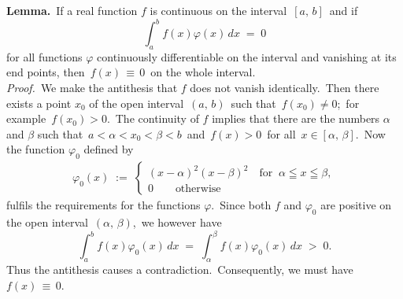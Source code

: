 \documentclass[12pt]{article}
\theoremstyle{definition}
\begin{document}
\textbf{Lemma.}\, If a real function $f$ is continuous on the interval \,$[a,\,b]$\, and if
$$\int_a^b\!f(x)\varphi(x)\,dx \;=\; 0$$
for all functions $\varphi$ continuously differentiable on the interval and vanishing at its end points, then\, 
$f(x) \,\equiv\, 0$\, on the whole interval.\\

\emph{Proof.}\, We make the antithesis that $f$ does not vanish identically.\, Then there exists a point $x_0$ of the open interval \,$(a,\,b)$\, such that\, $f(x_0) \neq 0$;\, for example\, $f(x_0) > 0$.\, The continuity of $f$ implies that there are the numbers $\alpha$ and $\beta$ such that\, $a < \alpha < x_0 < \beta < b$\, and\, $f(x) > 0$\, for all\, 
$x \in [\alpha,\,\beta]$.\, Now the function $\varphi_0$ defined by
\begin{align*}
\varphi_0(x) \;:=\; 
\begin{cases}
(x\!-\!\alpha)^2(x\!-\!\beta)^2 \quad \mbox{for}\;\; \alpha \leqq x \leqq \beta,\\
0 \qquad \mbox{otherwise}
\end{cases}
\end{align*}
fulfils the requirements for the functions $\varphi$.\, Since both $f$ and $\varphi_0$ are positive on the open interval\, $(\alpha,\,\beta)$,\, we however have
$$\int_a^b\!f(x)\varphi_0(x)\,dx \;=\; \int_\alpha^\beta\!f(x)\varphi_0(x)\,dx \;>\; 0.$$
Thus the antithesis causes a contradiction.\, Consequently, we must have\, $f(x) \,\equiv\, 0$.
\end{document}

